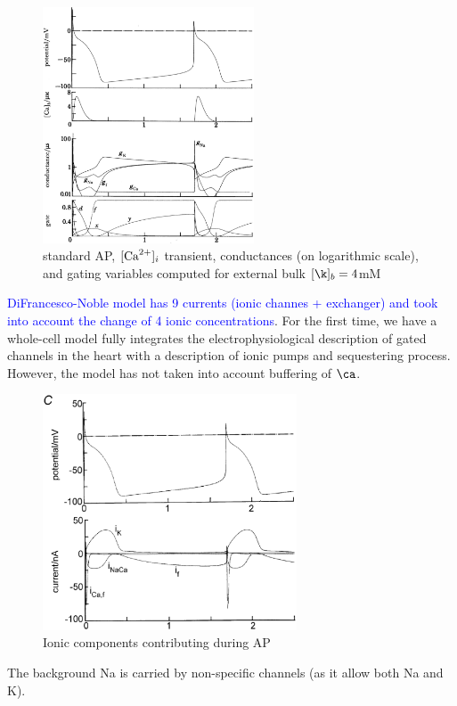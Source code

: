 \begin{figure}[hbt]
  \centerline{\includegraphics[height=7cm,
    angle=0]{./images/DiFrancesco_purkinjie.eps}}
  \caption{standard AP, $[{\text{Ca}^{2+}}]_i$ transient, conductances (on
    logarithmic scale), and gating variables computed for
    external bulk $[\k]_b=4$mM}
\label{fig:DiFrancesco_purkinje}
\end{figure}

\textcolor{blue}{DiFrancesco-Noble model has 9 currents (ionic channes
  + exchanger) and took into account the change of 4 ionic
  concentrations}.
For the first time, we have a whole-cell model fully integrates the
electrophysiological description of gated channels in the heart with a
description of ionic pumps and sequestering process. However, the
model has not taken into account buffering of $\ca$.

\begin{figure}[hbt]
  \centerline{\includegraphics[height=7cm,
    angle=0]{./images/Noble_purkinje.eps}}
\caption{Ionic components contributing during AP}
\label{fig:Noble_purkinjee}
\end{figure}

The background Na is carried by non-specific channels (as it allow
both Na and K). 


